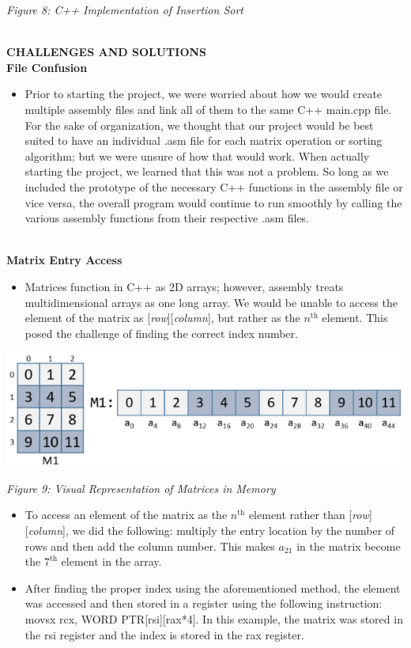 \documentclass[twoside]{article}
\begin{document}
\begin{center}\textit{Figure 8: C++ Implementation of Insertion Sort}\end{center}

\noindent \\ \textbf{CHALLENGES AND SOLUTIONS}
\noindent \\ \textbf{File Confusion}
\begin{itemize}
\item Prior to starting the project, we were worried about how we would create multiple assembly files and link all of them to the same C++ main.cpp file. For the sake of organization, we thought that our project would be best suited to have an individual .asm file for each matrix operation or sorting algorithm; but we were unsure of how that would work. When actually starting the project, we learned that this was not a problem. So long as we included the prototype of the necessary C++ functions in the assembly file or vice versa, the overall program would continue to run smoothly by calling the various assembly functions from their respective .asm files.
\end{itemize}

\noindent \\ \textbf{Matrix Entry Access}
\begin{itemize}
\item Matrices function in C++ as 2D arrays; however, assembly treats multidimensional arrays as one long array. We would be unable to access the element of the matrix as [\textit{row}][\textit{column}], but rather as the $n^{\text{th}}$ element. This posed the challenge of finding the correct index number.
\end{itemize}
\centerline{\includegraphics[scale=2]{images/matricesinmemory.png}}
\begin{center}\textit{Figure 9: Visual Representation of Matrices in Memory}\end{center}
\begin{itemize}
\item To access an element of the matrix as the $n^{\text{th}}$ element rather than [\textit{row}][\textit{column}], we did the following: multiply the entry location by the number of rows and then add the column number. This makes $a_{\text{21}}$ in the matrix become the $7^{\text{th}}$ element in the array.
\end{itemize}
\begin{itemize}
\item After finding the proper index using the aforementioned method, the element was accessed and then stored in a register using the following instruction: movsx rcx, WORD PTR[rsi][rax*4]. In this example, the matrix was stored in the rsi register and the index is stored in the rax register.
\end{itemize}
\end{document}
